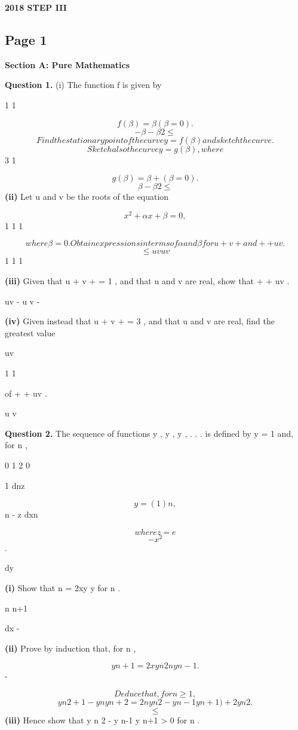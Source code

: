 \documentclass[12pt]{article}
\begin{document}
\begin{center}
{\Large \textbf{2018 STEP III}}
\end{center}

\subsection*{Page 1}
\begin{flushleft}
\bigskip\textbf{Section A: Pure Mathematics}\par
\bigskip\textbf{Question 1.} (i) The function f is given by\par
1 1\par
\[f(β) = β (β = 0) .\]
\[- β - β2 \leq\]
\[Find the stationary point of the curve y = f(β) and sketch the curve.\]
\[Sketch also the curve y = g(β) , where\]
3 1\par
\[g(β) = β + (β = 0) .\]
\[β - β2 \leq\]
\textbf{(ii)} Let u and v be the roots of the equation\par
\[x^2 + αx + β = 0 ,\]
1 1 1\par
\[where β = 0 . Obtain expressions in terms of α and β for u + v + and + + uv .\]
\[\leq uv u v\]
1 1 1\par
\textbf{(iii)} Given that u + v + = 1 , and that u and v are real, show that + + uv  .\par
uv - u v -\par
\textbf{(iv)} Given instead that u + v + = 3 , and that u and v are real, find the greatest value\par
uv\par
1 1\par
of + + uv .\par
u v\par
\bigskip\textbf{Question 2.} The sequence of functions y , y , y , . . . is defined by y = 1 and, for n  ,\par
0 1 2 0\par
1 dnz\par
\[y = ( 1)n ,\]
n - z dxn\par
\[where z = e\]
\[-x^2\]
.\par
dy\par
\textbf{(i)} Show that n = 2xy y for n  .\par
n n+1\par
dx -\par
\textbf{(ii)} Prove by induction that, for n  ,\par
\[y n+1 = 2xy n 2ny n-1 .\]
-\par
\[Deduce that, for n \geq 1 ,\]
\[y n 2 +1 - y n y n+2 = 2n y n 2 - y n-1 y n+1 ) + 2y n 2 .\]
\[\leq\]
\textbf{(iii)} Hence show that y n 2 - y n-1 y n+1 > 0 for n  .\par
\end{flushleft}
\end{document}
